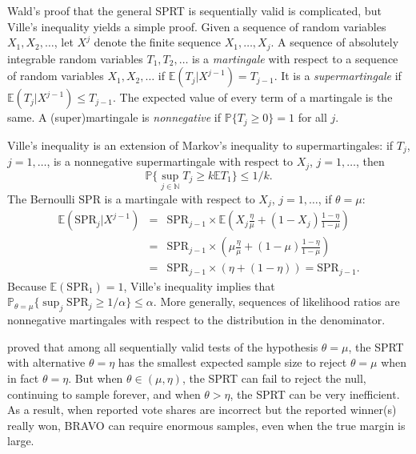 \documentclass[aoas]{imsart}
\newcommand{\EE}{\mathbb{E}}
\newcommand{\SPR}{\ensuremath{\mathrm{SPR}}}
\renewcommand{\Pr}{\mathbb{P}}
\begin{document}
Wald's proof that the general SPRT is sequentially valid is complicated, but Ville's inequality \citep{ville39} yields a simple proof.
Given a sequence of random variables $X_1, X_2, \ldots$, let $X^j$ denote the finite sequence $X_1, \ldots, X_j$.
A sequence of absolutely integrable random variables $T_1, T_2, \ldots$ is a \emph{martingale} with respect to a sequence of
random variables $X_1, X_2, \ldots$ if $\EE (T_j | X^{j-1}) = T_{j-1}$.
It is a \emph{supermartingale} if $\EE (T_j | X^{j-1}) \le T_{j-1}$.
The expected value of every term of a martingale is the same.
A (super)martingale is \emph{nonnegative} if $\Pr \{T_j \ge 0 \} = 1$ for all $j$.

Ville's inequality is an extension of Markov's inequality to supermartingales:
if $T_j$, $j=1, \ldots$, is a nonnegative supermartingale with respect to $X_j$, $j=1, \ldots$, then 
$$\Pr \{ \sup_{j \in \mathbb{N}} T_j \ge k\EE T_1\} \le 1/k.$$
The Bernoulli \SPR{} is a martingale with respect to $X_j$, $j=1, \ldots$, if $\theta = \mu$:
\begin{eqnarray}
\EE (\SPR_j | X^{j-1}) &=& \SPR_{j-1} \times \EE \left ( X_j \frac{\eta}{\mu} + (1-X_j) \frac{1-\eta}{1-\mu} \right ) \nonumber \\
&=& \SPR_{j-1} \times \left ( \mu \frac{\eta}{\mu} + (1-\mu) \frac{1-\eta}{1-\mu} \right )  \nonumber \\
&=& \SPR_{j-1} \times \left (\eta + (1-\eta) \right ) = \SPR_{j-1}.
\end{eqnarray}
Because $ \EE (\SPR_1) = 1$, Ville's inequality implies that $\Pr_{\theta = \mu} \{\sup_j \SPR_j \ge 1/\alpha \} \le \alpha$.
More generally, sequences of likelihood ratios are nonnegative martingales with respect to the distribution in the
denominator.

\citet{wald45} proved that among all sequentially valid tests of the hypothesis $\theta = \mu$, the SPRT with alternative
$\theta = \eta$ has the smallest expected sample size to reject $\theta=\mu$ when in fact $\theta = \eta$.
But when $\theta \in (\mu, \eta)$, the SPRT can fail to reject the null, continuing to sample forever,
and when $\theta > \eta$, the SPRT can be very inefficient.
As a result, when reported vote shares are incorrect but the reported winner(s) really won, BRAVO can require 
enormous samples, even when the true margin is large.
\end{document}
